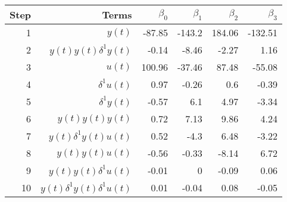 \begin{tabular}{rrrrrr}
Step & Terms & $\beta_{0}$ & $\beta_{1}$ & $\beta_{2}$ & $\beta_{3}$ \\ 
\hline 
1 & $y(t)$ & -87.85 & -143.2 & 184.06 & -132.51 \\ 
2 & $y(t)y(t)\delta^1 y(t)$ & -0.14 & -8.46 & -2.27 & 1.16 \\ 
3 & $u(t)$ & 100.96 & -37.46 & 87.48 & -55.08 \\ 
4 & $\delta^1 u(t)$ & 0.97 & -0.26 & 0.6 & -0.39 \\ 
5 & $\delta^1 y(t)$ & -0.57 & 6.1 & 4.97 & -3.34 \\ 
6 & $y(t)y(t)y(t)$ & 0.72 & 7.13 & 9.86 & 4.24 \\ 
7 & $y(t)\delta^1 y(t)u(t)$ & 0.52 & -4.3 & 6.48 & -3.22 \\ 
8 & $y(t)y(t)u(t)$ & -0.56 & -0.33 & -8.14 & 6.72 \\ 
9 & $y(t)y(t)\delta^1 u(t)$ & -0.01 & 0 & -0.09 & 0.06 \\ 
10 & $y(t)\delta^1 y(t)\delta^1 u(t)$ & 0.01 & -0.04 & 0.08 & -0.05 \\ 
\hline 
\end{tabular}